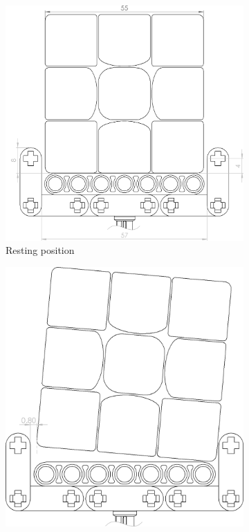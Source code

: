 \documentclass{report}
\begin{document}
    \begin{figure}[H]
    	\centering
 	   	\begin{subfigure}[b]{0.2\textwidth}
    		\includegraphics[width=\textwidth]{Resources/Images/dwgCradleCurvedEdgeNormal.png}
    		\caption{Resting position}
    		\label{fig:dwgCradleCurvedEdgeNormal}
    	\end{subfigure}
    	\hspace{10mm}
    	\begin{subfigure}[b]{0.2\textwidth}
    		\includegraphics[width=\textwidth]{Resources/Images/dwgCradleCurvedEdgeTilted.png}

\end{subfigure}
\end{figure}
\end{document}

